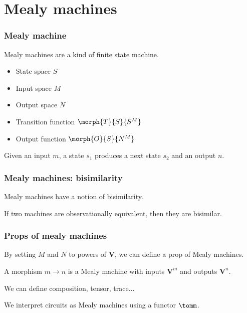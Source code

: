 \section{Mealy machines}

\begin{frame}
    \frametitle{Mealy machine}

    Mealy machines are a kind of \alert{finite state machine}.

    \pause
    \begin{itemize}
        \item \alert{State space} $S$ \pause
        \item \alert{Input space} $M$ \pause
        \item \alert{Output space} $N$ \pause
        \item \alert{Transition function} $\morph{T}{S}{S^M}$ \pause
        \item \alert{Output function} $\morph{O}{S}{N^M}$ \pause
    \end{itemize}

    Given an input $m$, a state $s_1$ produces a \alert{next state} $s_2$ and an \alert{output} $n$.

    \pause

    \begin{center}
        
    \end{center}

\end{frame}

\begin{frame}
    \frametitle{Mealy machines: bisimilarity}

    Mealy machines have a notion of \alert{bisimilarity}.

    \pause

    If two machines are \alert{observationally equivalent}, then they are bisimilar.

\end{frame}

\begin{frame}
    \frametitle{Props of mealy machines}

    By setting $M$ and $N$ to powers of $\textbf{V}$, we can define a prop of Mealy machines.

    \pause

    A morphism $m \to n$ is a Mealy machine with inputs $\textbf{V}^m$ and outputs $\textbf{V}^n$.
    
    \pause

    We can define composition, tensor, trace...

    \pause

    We interpret circuits as Mealy machines using a functor $\tomm$.

\end{frame}

